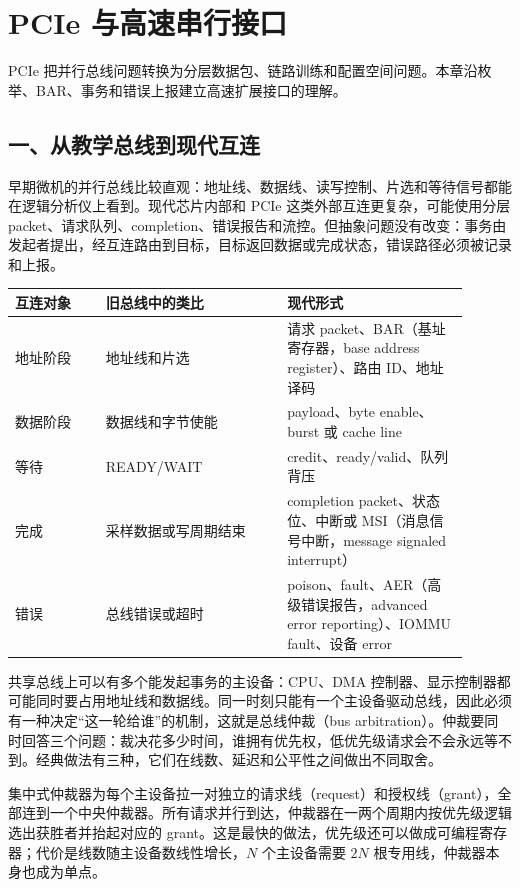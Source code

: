 \chapter{PCIe 与高速串行接口}

\begin{keyidea}
PCIe 把并行总线问题转换为分层数据包、链路训练和配置空间问题。本章沿枚举、BAR、事务和错误上报建立高速扩展接口的理解。
\end{keyidea}

\section{一、从教学总线到现代互连}

早期微机的并行总线比较直观：地址线、数据线、读写控制、片选和等待信号都能在逻辑分析仪上看到。现代芯片内部和 PCIe 这类外部互连更复杂，可能使用分层 packet、请求队列、completion、错误报告和流控。但抽象问题没有改变：事务由发起者提出，经互连路由到目标，目标返回数据或完成状态，错误路径必须被记录和上报。

\begin{longtable}{L{0.18\linewidth}L{0.36\linewidth}L{0.36\linewidth}}
\toprule
互连对象 & 旧总线中的类比 & 现代形式 \\
\midrule
地址阶段 & 地址线和片选 & 请求 packet、BAR（基址寄存器，base address register）、路由 ID、地址译码 \\\tablerowrule
数据阶段 & 数据线和字节使能 & payload、byte enable、burst 或 cache line \\\tablerowrule
等待 & READY/WAIT & credit、ready/valid、队列背压 \\\tablerowrule
完成 & 采样数据或写周期结束 & completion packet、状态位、中断或 MSI（消息信号中断，message signaled interrupt） \\\tablerowrule
错误 & 总线错误或超时 & poison、fault、AER（高级错误报告，advanced error reporting）、IOMMU fault、设备 error \\
\bottomrule
\end{longtable}

共享总线上可以有多个能发起事务的主设备：CPU、DMA 控制器、显示控制器都可能同时要占用地址线和数据线。同一时刻只能有一个主设备驱动总线，因此必须有一种决定“这一轮给谁”的机制，这就是总线仲裁（bus arbitration）。仲裁要同时回答三个问题：裁决花多少时间，谁拥有优先权，低优先级请求会不会永远等不到。经典做法有三种，它们在线数、延迟和公平性之间做出不同取舍。

集中式仲裁器为每个主设备拉一对独立的请求线（request）和授权线（grant），全部连到一个中央仲裁器。所有请求并行到达，仲裁器在一两个周期内按优先级逻辑选出获胜者并抬起对应的 grant。这是最快的做法，优先级还可以做成可编程寄存器；代价是线数随主设备数线性增长，$N$ 个主设备需要 $2N$ 根专用线，仲裁器本身也成为单点。

